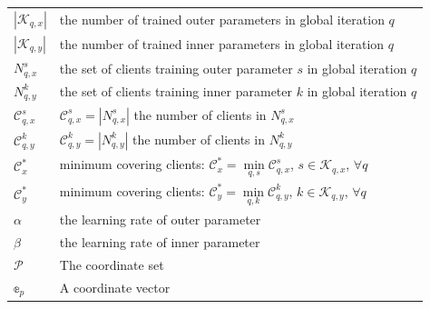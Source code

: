 \documentclass[lettersize,journal]{IEEEtran}
\begin{document}
\begin{table}[t]
\begin{tabular}[t]{p{1.3cm} p{6.2cm}}
        $|\mathcal{K}_{q,x}|$ & the number of trained outer parameters in global iteration $q$\\
        $|\mathcal{K}_{q,y}|$ & the number of trained inner parameters in global iteration $q$\\
        $N_{q,x}^s$ & the set of clients training outer parameter $s$ in global iteration $q$\\
        $N_{q,y}^k$ & the set of clients training inner parameter $k$ in global iteration $q$\\
        $\mathcal{C}_{q,x}^s$ & $\mathcal{C}_{q,x}^s=|N_{q,x}^s|$ the number of clients in $N_{q,x}^s$\\
        $\mathcal{C}_{q,y}^k$ & $\mathcal{C}_{q,y}^k=|N_{q,y}^k|$ the number of clients in $N_{q,y}^k$\\
        $\mathcal{C}^*_x$   & minimum covering clients: $\mathcal{C}^*_x=\min\limits_{q,s}\mathcal{C}_{q,x}^s$, $s\in \mathcal{K}_{q,x}$, $\forall q$ \\
        $\mathcal{C}^*_y$   & minimum covering clients: $\mathcal{C}^*_y=\min\limits_{q,k}\mathcal{C}_{q,y}^k$, $k\in \mathcal{K}_{q,y}$, $\forall q$ \\
        $\alpha$& the learning rate of outer parameter\\
        $\beta$& the learning rate of inner parameter\\
        $\mathcal{P}$&The coordinate set\\
        $\mathbb{e}_p$&A coordinate vector\\
		\hline
	\end{tabular}
\end{table}
\end{document}
